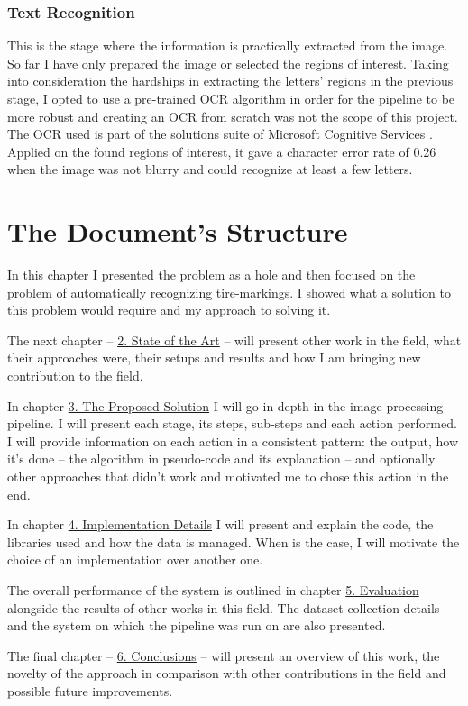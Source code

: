 \subsubsection{Text Recognition}

This is the stage where the information is practically extracted from the image. So far I have only prepared the image or selected the regions of interest. Taking into consideration the hardships in extracting the letters' regions in the previous stage, I opted to use a pre-trained OCR algorithm in order for the pipeline to be more robust and creating an OCR from scratch was not the scope of this project. The OCR used is part of the solutions suite of Microsoft Cognitive Services \cite{site:Microsoft_Cognitive_Services}. Applied on the found regions of interest, it gave a character error rate of 0.26 when the image was not blurry and could recognize at least a few letters.

\section{The Document's Structure}

In this chapter I presented the problem as a hole and then focused on the problem of automatically recognizing tire-markings. I showed what a solution to this problem would require and my approach to solving it.

The next chapter -- \hyperref[chap:state-of-the-art]{2. State of the Art} -- will present other work in the field, what their approaches were, their setups and results and how I am bringing new contribution to the field.

In chapter \hyperref[chap:proposed-solution]{3. The Proposed Solution} I will go in depth in the image processing pipeline. I will present each stage, its steps, sub-steps and each action performed. I will provide information on each action in a consistent pattern: the output, how it's done -- the algorithm in pseudo-code and its explanation -- and optionally other approaches that didn't work and motivated me to chose this action in the end.

In chapter \hyperref[chap:implementation-details]{4. Implementation Details} I will present and explain the code, the libraries used and how the data is managed. When is the case, I will motivate the choice of an implementation over another one.

The overall performance of the system is outlined in chapter \hyperref[chap:evaluation]{5. Evaluation} alongside the results of other works in this field. The dataset collection details and the system on which the pipeline was run on are also presented.

The final chapter -- \hyperref[chap:conclusions]{6. Conclusions} -- will present an overview of this work, the novelty of the approach in comparison with other contributions in the field and possible future improvements.
